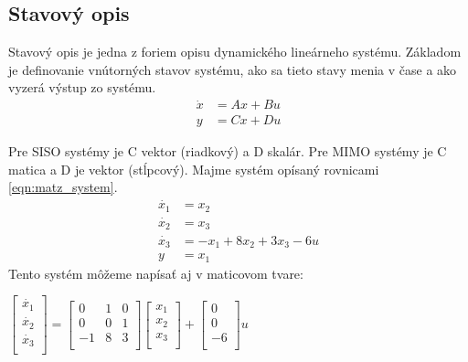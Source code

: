 \documentclass[../main.tex]{subfiles}
\begin{document}
\subsection{Stavový opis}
Stavový opis je jedna z foriem opisu dynamického lineárneho systému. Základom je definovanie vnútorných stavov systému, ako sa tieto stavy menia v čase a ako vyzerá výstup zo systému.
\begin{equation}
	\begin{aligned}
        \dot{x} &= Ax + Bu \\
        y &= Cx + Du
	\end{aligned}
	\label{eqn:matz_stavovaRovnica}
\end{equation}

Pre SISO systémy je C vektor (riadkový) a D skalár. Pre MIMO systémy je C matica a D je vektor (stĺpcový). Majme systém opísaný rovnicami \ref{eqn:matz_system}.
\begin{equation}
	\begin{split}
        \dot{x_1} &= x_2 \\
		\dot{x_2} &= x_3 \\
		\dot{x_3} &= -x_1 + 8x_2 + 3x_3 - 6u \\
        y &= x_1
	\end{split}
	\label{eqn:matz_system}
\end{equation}
Tento systém môžeme napísať aj v maticovom tvare:
        \begin{center}
		$\begin{bmatrix} 
			\dot{x_1} \\ 
			\dot{x_2} \\ 
			\dot{x_3} \\ 
		\end{bmatrix}  = 
		\begin{bmatrix} 
			0 & 1 & 0 \\ 
			0 & 0 & 1 \\ 
			-1 & 8 & 3 \\ 
		\end{bmatrix} 
		\begin{bmatrix} 
			x_1 \\ 
			x_2 \\ 
			x_3 \\ 
		\end{bmatrix} +
		\begin{bmatrix} 
			0 \\ 
			0 \\ 
			-6 \\ 
		\end{bmatrix}
		u $
	\label{eqn:matz_system2}
        \end{center}
\end{document}
